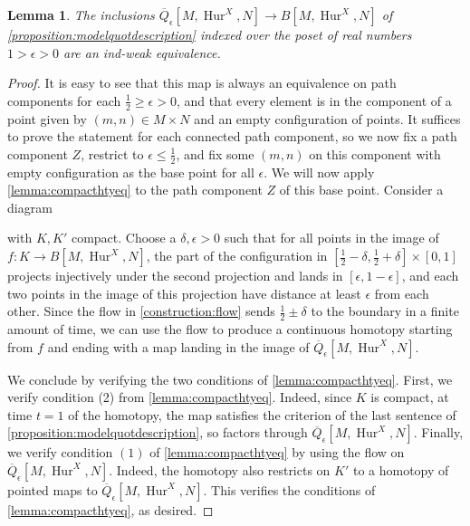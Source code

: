 \documentclass[12 pt]{amsart}
\theoremstyle{plain}
\newtheorem{lemma}[theorem]{Lemma}
\theoremstyle{definition}
\theoremstyle{remark}
\numberwithin{equation}{section}
\DeclareMathOperator\Hur{Hur}
\begin{document}
\begin{lemma}\label{lemma:scanningunpointed}
	The inclusions $\overline{Q}_\epsilon[M,\Hur^{X},N] \to B[M,\Hur^{X},N]$
	of  \autoref{proposition:modelquotdescription} indexed over the poset of
	real numbers $1>\epsilon>0$ are an ind-weak equivalence.
\end{lemma}

\begin{proof}
	It is easy to see that this map is always an equivalence on path
	components for each $\frac 1 2 \geq \epsilon>0$, and that every element is in the
	component of a point given by $(m,n) \in M\times N$ and an empty
	configuration of points.
	It suffices to prove the statement for each connected path component, so we
	now fix a path component $Z$, 
	restrict to $\epsilon\leq\frac 1 2$, and fix some $(m,n)$ on this
	component with empty configuration as the base point for all
	$\epsilon$. We will now apply \autoref{lemma:compacthtyeq} to the path
	component $Z$ of this base point. 
	Consider a diagram 	
	\begin{center}
	\end{center} with $K,K'$ compact. Choose a $\delta,\epsilon>0$ such that
	for all points in the image of $f : K \to B[M, \Hur^X, N]$, the part of the configuration in
	$[\frac 1 2-\delta,\frac 1 2+\delta]\times [0,1]$ projects injectively
	under the second projection and lands in $[\epsilon,
	1-\epsilon]$, and each two points in the
	image of this projection have distance at least $\epsilon$ from each
	other.
	Since the flow in \autoref{construction:flow} sends $\frac 1 2 \pm \delta$
	to the boundary in a finite amount of time, we can use the flow to
	produce a continuous homotopy starting from $f$ and ending with a map
	landing in the image of $\overline{Q}_{\epsilon}[M,\Hur^{X},N]$. 

	We conclude by verifying the two conditions of
	\autoref{lemma:compacthtyeq}.
	First, we verify condition (2) from \autoref{lemma:compacthtyeq}.
	Indeed, since $K$ is compact, at time $t=1$ of the homotopy, the map satisfies the criterion of the last sentence of \autoref{proposition:modelquotdescription}, so factors through $\overline{Q}_{\epsilon}[M,\Hur^{X},N]$.
	Finally, we verify condition $(1)$ of \autoref{lemma:compacthtyeq}
	by using the flow on $\overline{Q}_{\epsilon}[M,\Hur^{X},N]$. 
	Indeed, the homotopy also
	restricts on $K'$ to a homotopy of pointed maps to
	$\overline{Q}_{\epsilon}[M,\Hur^{X},N]$. This verifies the conditions of
	\autoref{lemma:compacthtyeq}, as desired.
	\end{proof}
\end{document}
